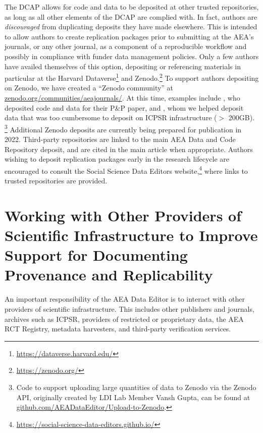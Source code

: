 \documentclass[PP]{AEA}
\newcommand{\aeadcr}{AEA Data and Code Repository}
\newcommand{\urlcite}[2]{#2\footnote{\url{#1}}}
\newcommand{\purlcite}[2]{#2.\footnote{\url{#1}}}
\newcommand{\curlcite}[2]{#2,\footnote{\url{#1}}}
\begin{document}
The \ac{DCAP} allows for code and data  to be deposited at other trusted repositories, as long as all other elements of the \ac{DCAP} are complied with. In fact, authors are \textit{discouraged} from duplicating deposits they have made elsewhere. This is intended to allow authors to create replication packages prior to submitting at the AEA's journals, or any other journal, as a component of a reproducible workflow and possibly in compliance with funder data management policies. Only a few authors have availed themselves of this option, depositing or referencing materials in particular at the \urlcite{https://dataverse.harvard.edu/}{Harvard Dataverse} and \purlcite{https://zenodo.org/}{Zenodo} To support authors depositing on Zenodo, we have created a ``Zenodo community'' at \href{https://zenodo.org/communities/aeajournals/}{zenodo.org/communities/aeajournals/}. At this time, examples include \citet{caroline_fohlin_2021_5151203}, who deposited code and data for their P\&P paper, and \citet{gendron_carrier_nicolas_2020_4317553}, whom we helped deposit data that was too cumbersome to deposit on ICPSR infrastructure ($>$ 200GB).%
\footnote{Code to support uploading large quantities of data to Zenodo via the Zenodo API, originally created by LDI Lab Member Vansh Gupta, can be found at \href{https://github.com/AEADataEditor/Upload-to-Zenodo}{github.com/AEADataEditor/Upload-to-Zenodo}.} 
Additional Zenodo deposits are currently being prepared for publication in 2022. Third-party repositories are linked to the main \aeadcr{} deposit, and are cited in the main article when appropriate. Authors wishing to deposit replication packages early in the research lifecycle are encouraged to consult the \curlcite{https://social-science-data-editors.github.io/}{Social Science Data Editors website} where links to trusted repositories are provided.  


\section{Working with Other Providers of Scientific Infrastructure to Improve Support for Documenting Provenance and Replicability}
\label{sec:coordination}

An important responsibility of the AEA Data Editor is to interact with other providers of scientific infrastructure. This includes other publishers and journals, archives such as ICPSR, providers of restricted or proprietary data, the AEA RCT Registry, metadata harvesters, and third-party verification services. 
\end{document}
